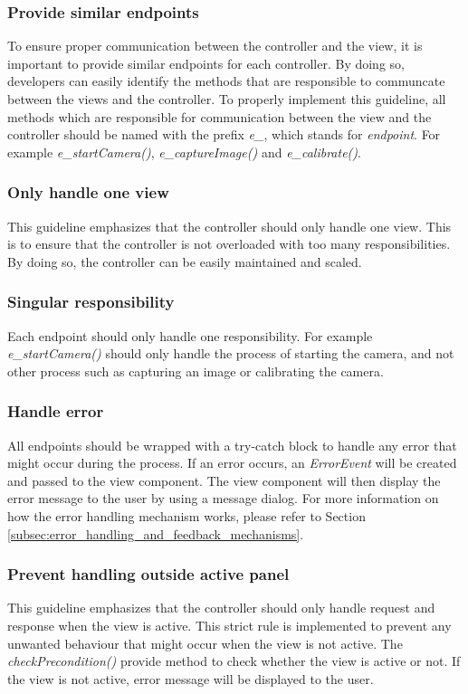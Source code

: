\subsubsection{Provide similar endpoints}
To ensure proper communication between the controller and the view, it is important to provide similar endpoints for each controller. By doing so, developers can easily identify the methods that are responsible to communcate between the views and the controller. To properly implement this guideline, all methods which are responsible for communication between the view and the controller should be named with the prefix \textit{e\_}, which stands for \textit{endpoint}. For example \textit{e\_startCamera()}, \textit{e\_captureImage()} and \textit{e\_calibrate()}.

\subsubsection{Only handle one view}
This guideline emphasizes that the controller should only handle one view. This is to ensure that the controller is not overloaded with too many responsibilities. By doing so, the controller can be easily maintained and scaled.

\subsubsection{Singular responsibility}
Each endpoint should only handle one responsibility. For example \textit{e\_startCamera()} should only handle the process of starting the camera, and not other process such as capturing an image or calibrating the camera.

\subsubsection{Handle error}
All endpoints should be wrapped with a try-catch block to handle any error that might occur during the process. If an error occurs, an \textit{ErrorEvent} will be created and passed to the view component. The view component will then display the error message to the user by using a message dialog. For more information on how the error handling mechanism works, please refer to Section \ref{subsec:error_handling_and_feedback_mechanisms}.

\subsubsection{Prevent handling outside active panel}
\label{subsec:prevent_handling_outside_active_panel}
This guideline emphasizes that the controller should only handle request and response when the view is active. This strict rule is implemented to prevent any unwanted behaviour that might occur when the view is not active. The \textit{checkPrecondition()} provide method to check whether the view is active or not. If the view is not active, error message will be displayed to the user.

